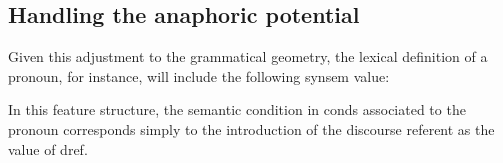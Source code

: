 \documentclass[output=paper
,modfonts
,nonflat]{langsci/langscibook}
\begin{document}
\subsection{Handling the anaphoric potential}

Given this adjustment to the grammatical geometry, 
the lexical definition of a pronoun,
for instance, will include the following {\sc synsem} value:

\avmoptions{}




In this feature structure, the semantic condition in {\sc conds} associated
to the pronoun corresponds simply to the introduction of the discourse referent 
as the value of {\sc dref}.
\end{document}
